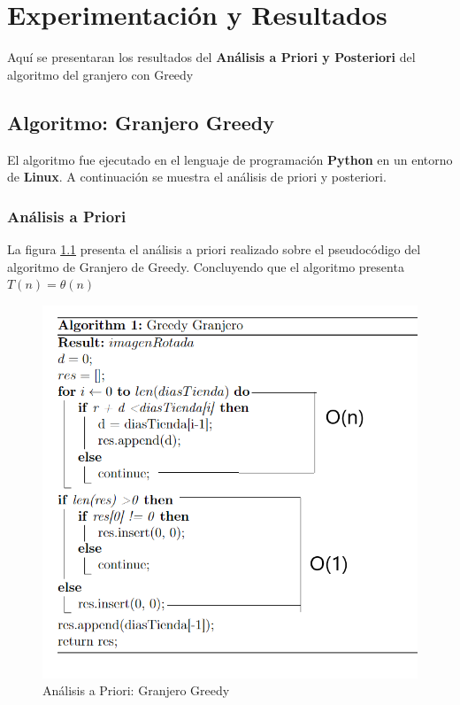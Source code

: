 \chapter{Experimentación y Resultados}
    Aquí se presentaran los resultados del \textbf{Análisis a Priori y Posteriori} del algoritmo del granjero con Greedy
    
\section{Algoritmo: Granjero Greedy}
El algoritmo fue ejecutado en el lenguaje de programación \textbf{Python} en un entorno de \textbf{Linux}. A continuación se muestra el análisis de priori y posteriori. 
    \subsection{Análisis a Priori}
        La figura \ref{fig:priori} presenta el análisis a priori realizado sobre el pseudocódigo del algoritmo de Granjero de Greedy. Concluyendo que el algoritmo presenta \(T(n) = \theta(n)\)
        
        \begin{figure}[htp!]
            \centering
            \includegraphics[width=0.5 \textwidth]{Images/A_Priori/priori.png}
            \caption{Análisis a Priori: Granjero Greedy}
            \label{fig:priori}
        \end{figure}
    
    \newpage    
